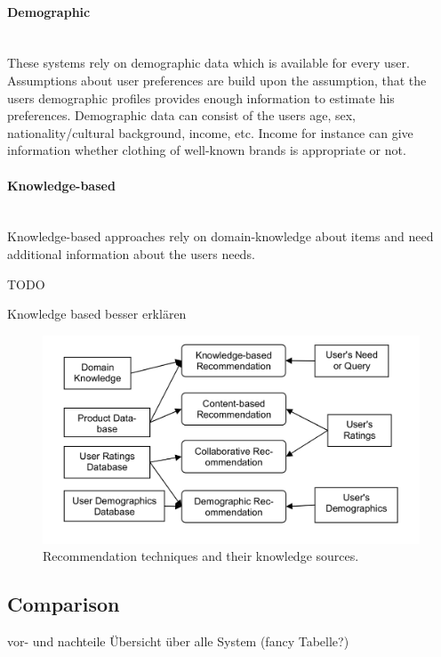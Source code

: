 \paragraph{Demographic}~\\
These systems rely on demographic data which is available for every user.
Assumptions about user preferences are build upon the assumption, that the users demographic profiles provides enough information to estimate his preferences.
Demographic data can consist of the users age, sex, nationality/cultural background, income, etc.\citep[p.~12]{ricci:2011}
Income for instance can give information whether clothing of well-known brands is appropriate or not.

\paragraph{Knowledge-based}~\\
Knowledge-based approaches rely on domain-knowledge about items and need additional information about the users needs.
\citep[p.~12-13]{ricci:2011}

TODO

Knowledge based besser erkl\"aren

\begin{figure}[h]
    \center
    \includegraphics[scale=0.3]{inc/recommendersystems/RecommendationTechniquesAndKnowledgeSources.png}
    \caption{Recommendation techniques and their knowledge sources.\citep[p.~379]{burke:2007}}
\end{figure}

\subsection{Comparison}
vor- und nachteile
\"Ubersicht \"uber alle System (fancy Tabelle?)

